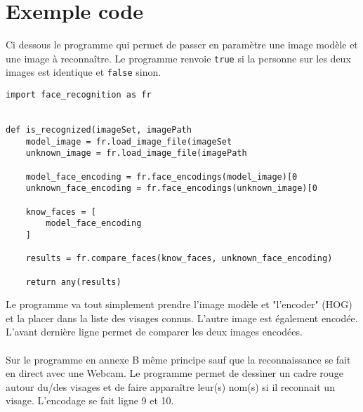 \section{Exemple code}
Ci dessous le programme qui permet de passer en paramètre une image modèle et
une image à reconnaître. Le programme renvoie \verb|true| si la personne sur les deux
images est identique et \verb|false| sinon.
\\
\begin{verbatim}
import face_recognition as fr


def is_recognized(imageSet, imagePath
    model_image = fr.load_image_file(imageSet
    unknown_image = fr.load_image_file(imagePath

    model_face_encoding = fr.face_encodings(model_image)[0
    unknown_face_encoding = fr.face_encodings(unknown_image)[0

    know_faces = [
        model_face_encoding
    ]

    results = fr.compare_faces(know_faces, unknown_face_encoding)

    return any(results)
\end{verbatim}

Le programme va tout simplement prendre l'image modèle et "l'encoder" (HOG) et
la placer dans la liste des visages connus. L'autre image est également
encodée. L'avant dernière ligne permet de comparer les deux images encodées.
\\
\\
Sur le programme en annexe B même principe sauf que la reconnaissance se fait en direct
avec une Webcam. Le programme permet de dessiner un cadre rouge autour du/des
visages et de faire apparaître leur(s) nom(s) si il reconnait un visage.
L'encodage se fait ligne 9 et 10.
\newpage
